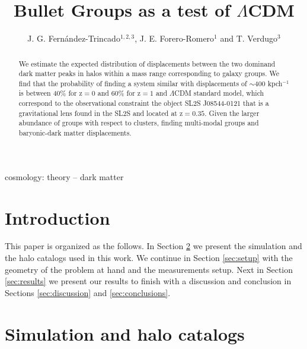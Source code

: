 \documentclass{emulateapj}
\begin{document}
 

\title{Bullet Groups as a test of $\Lambda$CDM}
\author{J. G. Fern\'andez-Trincado$^{1,2,3}$, J. E. Forero-Romero$^1$
  and T. Verdugo$^3$} 

\begin{abstract}
We estimate the expected distribution of displacements between the two
dominand dark matter peaks in halos within a mass range corresponding
to galaxy groups. We find that the probability of finding a system
similar with displacements of $\sim$400 kpch$^{-1}$ is between 40\%
for z$=0$ and 60\% for z$=1$ and $\Lambda$CDM standard model, which
correspond to the observational constraint the object SL2S J08544-0121
that is  a gravitational lens found in the SL2S and located at
z$=0.35$. Given the larger abundance of groups with respect to
clusters, finding multi-modal groups and baryonic-dark matter
displacements.  
\end{abstract}

\begin{keywords}
{cosmology: theory -- dark matter} 
\end{keywords}

\section{Introduction}


This paper is organized as the follows. In Section
\ref{sec:simulation} we present the simulation and the halo catalogs
used in this work. We continue in Section \ref{sec:setup} with the
geometry of the problem at hand and the measurements setup. Next in
Section \ref{sec:results} we present our results to finish with a
discussion and conclusion in Sections \ref{sec:discussion} and
\ref{sec:conclusions}. 


\section{Simulation and halo catalogs}
\label{sec:simulation}
\end{document}
